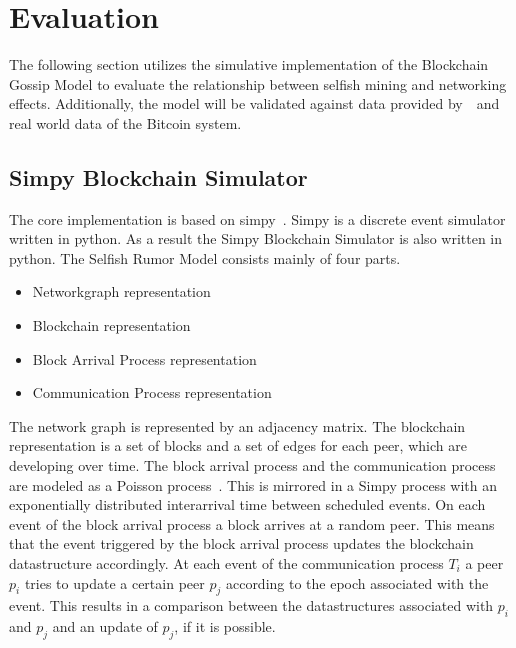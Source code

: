 \chapter{Evaluation}\label{chap:evaluation}
The following section utilizes the simulative implementation of the Blockchain Gossip Model to evaluate the relationship between selfish mining and networking effects. Additionally, the model will be validated against data provided by~~and real world data of the Bitcoin system.
\section{Simpy Blockchain Simulator}
The core implementation is based on simpy~\cite{simpy}. Simpy is a discrete event simulator written in python. As a result the Simpy Blockchain Simulator is also written in python. 
The Selfish Rumor Model consists mainly of four parts. 
\begin{itemize}
\item Networkgraph representation
\item Blockchain representation
\item Block Arrival Process representation
\item Communication Process representation
\end{itemize}
The network graph is represented by an adjacency matrix. The blockchain representation is a set of blocks and a set of edges for each peer, which are developing over time. The block arrival process and the communication process are modeled as a Poisson process~\cite{poisson}. This is mirrored in a Simpy process with an exponentially distributed interarrival time between scheduled events.
On each event of the block arrival process a block arrives at a random peer. This means that the event triggered by the block arrival process updates the blockchain datastructure accordingly.
At each event of the communication process $T_i$ a peer $p_i$ tries to update a certain peer $p_j$ according to the epoch associated with the event. This results in a comparison between the datastructures associated with $p_i$ and $p_j$ and an update of $p_j$, if it is possible.

